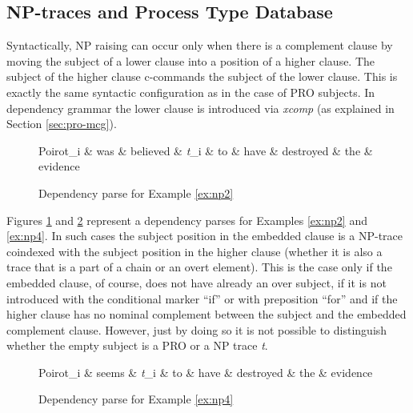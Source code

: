 \subsection{NP-traces and Process Type Database}
Syntactically, NP raising can occur only when there is a complement clause by moving the subject of a lower clause into a position of a higher clause. The subject of the higher clause c-commands the subject of the lower clause. This is exactly the same syntactic configuration as in the case of PRO subjects. In dependency grammar the lower clause is introduced via \textit{xcomp} (as explained in Section \ref{sec:pro-mcg}).

\begin{figure}[!ht]
	\centering
	\begin{dependency}
		\begin{deptext}[]
			Poirot_i \& was \& believed \& \textit{t}_i \& to \& have \& destroyed \& the \& evidence \\
		\end{deptext}
	\end{dependency}
	\caption{Dependency parse for Example \ref{ex:np2}}
	\label{fig:np-mcg1}
\end{figure}

Figures \ref{fig:np-mcg1} and \ref{fig:np-mcg2} represent a dependency parses for Examples \ref{ex:np2} and \ref{ex:np4}. In such cases the subject position in the embedded clause is a NP-trace coindexed with the subject position in the higher clause (whether it is also a trace that is a part of a chain or an overt element). This is the case only if the embedded clause, of course, does not have already an over subject, if it is not introduced with the conditional marker ``if'' or with preposition ``for'' and if the higher clause has no nominal complement between the subject and the embedded complement clause. 
However, just by doing so it is not possible to distinguish whether the empty subject is a PRO or a NP trace \textit{t}. 

\begin{figure}[!ht]
	\centering
	\begin{dependency}
		\begin{deptext}[]
			Poirot_i \& seems \& \textit{t}_i \& to \& have \& destroyed \& the \& evidence \\
		\end{deptext}
	\end{dependency}
	\caption{Dependency parse for Example \ref{ex:np4}}
	\label{fig:np-mcg2} 
\end{figure}

